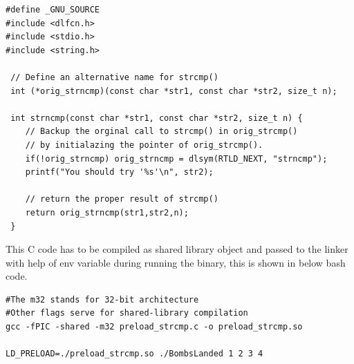 \documentclass[11pt]{article}
\begin{document}
\begin{verbatim}
#define _GNU_SOURCE
#include <dlfcn.h>
#include <stdio.h>
#include <string.h>

 // Define an alternative name for strcmp()
 int (*orig_strncmp)(const char *str1, const char *str2, size_t n);

 int strncmp(const char *str1, const char *str2, size_t n) {
    // Backup the orginal call to strcmp() in orig_strcmp()
    // by initialazing the pointer of orig_strcmp().
    if(!orig_strncmp) orig_strncmp = dlsym(RTLD_NEXT, "strncmp");
    printf("You should try '%s'\n", str2);

    // return the proper result of strcmp()
    return orig_strncmp(str1,str2,n);
 }
\end{verbatim}

This C code has to be compiled as shared library object and passed to the linker with help of env variable during running the binary, this is shown in below bash code.
\begin{verbatim}
#The m32 stands for 32-bit architecture
#Other flags serve for shared-library compilation
gcc -fPIC -shared -m32 preload_strcmp.c -o preload_strcmp.so

LD_PRELOAD=./preload_strcmp.so ./BombsLanded 1 2 3 4
\end{verbatim}
\end{document}
